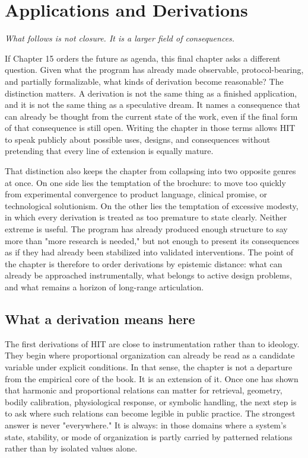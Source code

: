 \chapter{Applications and Derivations}

\epigraph{\emph{What follows is not closure. It is a larger field of consequences.}}{}

If Chapter 15 orders the future as agenda, this final chapter asks a different question. Given what the program has already made observable, protocol-bearing, and partially formalizable, what kinds of derivation become reasonable? The distinction matters. A derivation is not the same thing as a finished application, and it is not the same thing as a speculative dream. It names a consequence that can already be thought from the current state of the work, even if the final form of that consequence is still open. Writing the chapter in those terms allows HIT to speak publicly about possible uses, designs, and consequences without pretending that every line of extension is equally mature.

That distinction also keeps the chapter from collapsing into two opposite genres at once. On one side lies the temptation of the brochure: to move too quickly from experimental convergence to product language, clinical promise, or technological solutionism. On the other lies the temptation of excessive modesty, in which every derivation is treated as too premature to state clearly. Neither extreme is useful. The program has already produced enough structure to say more than "more research is needed," but not enough to present its consequences as if they had already been stabilized into validated interventions. The point of the chapter is therefore to order derivations by epistemic distance: what can already be approached instrumentally, what belongs to active design problems, and what remains a horizon of long-range articulation.


\section{What a derivation means here}


The first derivations of HIT are close to instrumentation rather than to ideology. They begin where proportional organization can already be read as a candidate variable under explicit conditions. In that sense, the chapter is not a departure from the empirical core of the book. It is an extension of it. Once one has shown that harmonic and proportional relations can matter for retrieval, geometry, bodily calibration, physiological response, or symbolic handling, the next step is to ask where such relations can become legible in public practice. The strongest answer is never "everywhere." It is always: in those domains where a system's state, stability, or mode of organization is partly carried by patterned relations rather than by isolated values alone.

